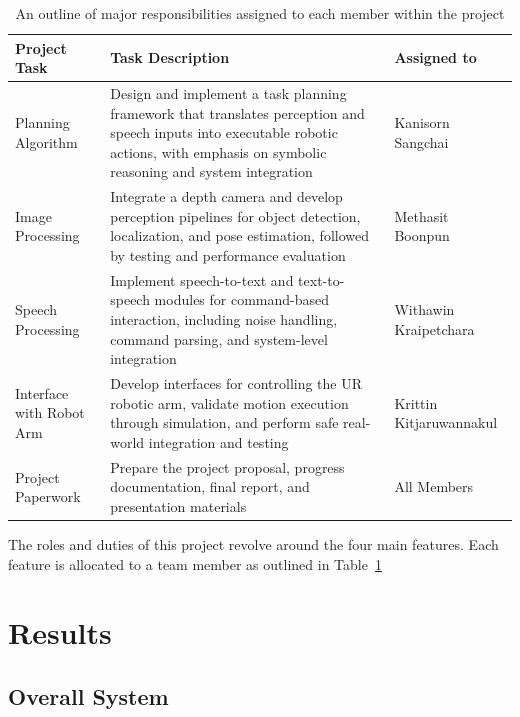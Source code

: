 \documentclass[12pt]{extarticle}
\begin{document}
{
\renewcommand{\arraystretch}{1.3} %
\begin{table}[h!]
    \centering
    \begin{tabular}{|l|p{6cm}|l|}
        \hline
        \textbf{Project Task} & \textbf{Task Description} & \textbf{Assigned to} \\
        \hline
        Planning Algorithm & Design and implement a task planning framework that translates perception and speech inputs into executable robotic actions, with emphasis on symbolic reasoning and system integration & Kanisorn Sangchai \\
        \hline
        Image Processing & Integrate a depth camera and develop perception pipelines for object detection, localization, and pose estimation, followed by testing and performance evaluation & Methasit Boonpun \\
        \hline
        Speech Processing & Implement speech-to-text and text-to-speech modules for command-based interaction, including noise handling, command parsing, and system-level integration & Withawin Kraipetchara \\
        \hline
        Interface with Robot Arm & Develop interfaces for controlling the UR robotic arm, validate motion execution through simulation, and perform safe real-world integration and testing & Krittin Kitjaruwannakul \\
        \hline
        Project Paperwork & Prepare the project proposal, progress documentation, final report, and presentation materials & All Members \\
        \hline
    \end{tabular}
    \caption{An outline of major responsibilities assigned to each member within the project}
    \label{tab:roles_responsibilities}
\end{table}
}

The roles and duties of this project revolve around the four main features. Each feature is allocated to a team member as outlined in Table~\ref{tab:roles_responsibilities}

\newpage
\section{Results}

\subsection{Overall System}
\end{document}
